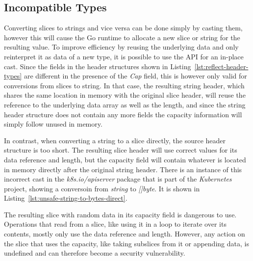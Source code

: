 
\subsection{Incompatible Types}\label{subsec:unsafe-security-problems:slice-casts:incompatible-types}

Converting slices to strings and vice versa can be done simply by casting them, however this will cause the Go runtime
to allocate a new slice or string for the resulting value.
To improve efficiency by reusing the underlying data and only reinterpret it as data of a new type, it is possible to
use the \unsafe{} \acrshort{API} for an in-place cast.
Since the fields in the header structures shown in Listing~\ref{lst:reflect-header-types} are different in the presence
of the \textit{Cap} field, this is however only valid for conversions from slices to string.
In that case, the resulting string header, which shares the same location in memory with the original slice header, will
reuse the reference to the underlying data array as well as the length, and since the string header structure does not
contain any more fields the capacity information will simply follow unused in memory.

In contrast, when converting a string to a slice directly, the source header structure is too short.
The resulting slice header will use correct values for its data reference and length, but the capacity field will
contain whatever is located in memory directly after the original string header.
There is an instance of this incorrect cast in the \textit{k8s.io/apiserver} package that is part of the
\textit{Kubernetes} project, showing a conversoin from \textit{string} to \textit{[]byte}.
It is shown in Listing~\ref{lst:unsafe-string-to-bytes-direct}.



The resulting slice with random data in its capacity field is dangerous to use.
Operations that read from a slice, like using it in a loop to iterate over its contents, mostly only use the data
reference and length.
However, any action on the slice that uses the capacity, like taking subslices from it or appending data, is undefined
and can therefore become a security vulnerability.



